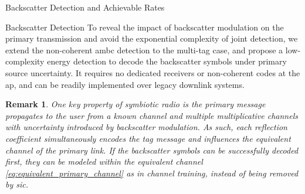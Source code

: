 \documentclass[journal]{IEEEtran}
\newtheorem{remark}{Remark}
\begin{document}
\begin{section}{Backscatter Detection and Achievable Rates}
		\begin{subsection}{Backscatter Detection}
			To reveal the impact of backscatter modulation on the primary transmission and avoid the exponential complexity of joint detection, we extend the non-coherent \gls{ambc} detection \cite{Qian2019} to the multi-tag case, and propose a low-complexity energy detection to decode the backscatter symbols under primary source uncertainty. It requires no dedicated receivers or non-coherent codes at the \gls{ap}, and can be readily implemented over legacy downlink systems.

			\begin{remark}
				One key property of symbiotic radio is the primary message propagates to the user from a known channel and multiple multiplicative channels with uncertainty introduced by backscatter modulation. As such, each reflection coefficient simultaneously encodes the tag message and influences the equivalent channel of the primary link. If the backscatter symbols can be successfully decoded first, they can be modeled within the equivalent channel \eqref{eq:equivalent_primary_channel} as in channel training, instead of being removed by \gls{sic}.
			\end{remark}


\end{subsection}
\end{section}
\end{document}
